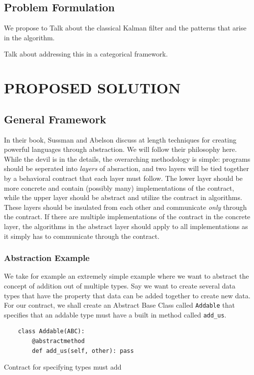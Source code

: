 \documentclass[letterpaper, 10 pt, conference]{ieeeconf}  %
\begin{document}
\subsection{Problem Formulation}

We propose to 
Talk about the classical Kalman filter and the patterns that arise in the algorithm.

Talk about addressing this in a categorical framework.

\section{PROPOSED SOLUTION}

\subsection{General Framework}

In their book, Sussman and Abelson \cite{sicp} discuss at length techniques for creating powerful languages through abstraction.
We will follow their philosophy here.
While the devil is in the details, the overarching methodology is simple: programs should be seperated into \emph{layers} of absraction, and two layers will be tied together by a behavioral contract that each layer must follow. The lower layer should be more concrete and contain (possibly many) implementations of the contract, while the upper layer should be abstract and utilize the contract in algorithms.
These layers should be insulated from each other and communicate \emph{only} through the contract.
If there are multiple implementations of the contract in the concrete layer, the algorithms in the abstract layer should apply to all implementations as it simply has to communicate through the contract.

\subsubsection{Abstraction Example}

We take for example an extremely simple example where we want to abstract the concept of addition out of multiple types.
Say we want to create several data types that have the property that data can be added together to create new data.
For our contract, we shall create an Abstract Base Class called \texttt{Addable} that specifies that an addable type must have a built in method called \texttt{add\_us}.

\begin{listing}
\begin{verbatim}
	class Addable(ABC):
		@abstractmethod
		def add_us(self, other): pass
\end{verbatim}
    \caption{Contract for specifying types must add}
\label{listing:1}
\end{listing}
\end{document}
